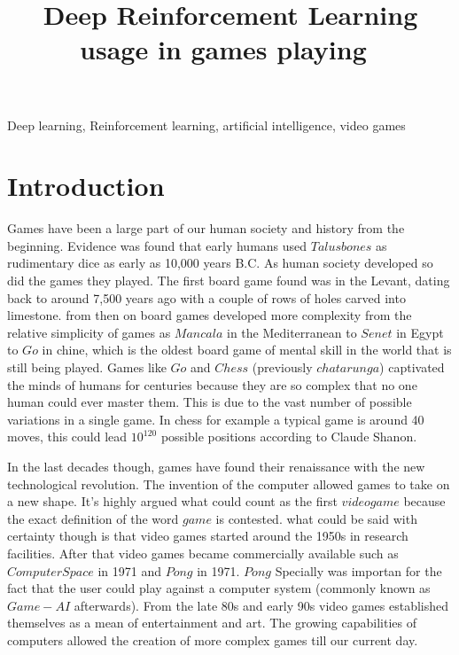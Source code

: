 \documentclass[conference]{IEEEtran}
\begin{document}
\title{Deep Reinforcement Learning usage in games playing\
}

\author{
}





\maketitle

\begin{abstract}

\end{abstract}

\begin{IEEEkeywords}
Deep learning, Reinforcement learning, artificial intelligence, video games
\end{IEEEkeywords}

\section{Introduction}
Games have been a large part of our human society and history from the beginning. Evidence was found that early humans used $Talus bones$ as rudimentary dice as early as 10,000 years B.C\cite{10.1007/978-981-10-0575-6_1       }. As human society developed so did the games they played. The first board game found was in the Levant, dating back to around 7,500 years ago \cite{simpson2007earliest} with a couple of rows of holes carved into limestone. from then on board games developed more complexity from the relative simplicity of games as $Mancala$ in the Mediterranean to $Senet$ in Egypt to $Go$ in chine, which is the  oldest board game of mental skill in the world that is still being played\cite{shotwell1994game}. Games like $Go$ and $Chess$ (previously $chatarunga$) captivated the minds of humans for centuries because they are so complex that no one human could ever master them. This is due to the vast number of possible variations in a single game. In chess for example a typical game is around 40 moves, this could lead $10^{120}$ possible positions according to Claude Shanon\cite{shannon1950xxii}.

In the last decades though, games have found their renaissance with the new technological revolution. The invention of the computer allowed games to take on a new shape. It's highly argued what could count as the first $video game$ because the exact definition of the word $game$ is contested. what could be said with certainty though is that video games started around the 1950s in research facilities. After that video games became commercially available such as $Computer Space$ in 1971 and $Pong$ in 1971. $Pong$ Specially was importan for the fact that the user could play against a computer system (commonly known as $Game-AI$ afterwards). From the late 80s and early 90s video games established themselves as a mean of entertainment and art. The growing capabilities of computers allowed the creation of more complex games till our current day.
\end{document}
